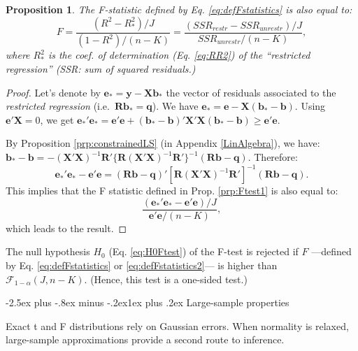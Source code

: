 \documentclass[
  11pt,
]{book}
\makeatletter
\renewcommand\subsection{\@startsection{subsection}{2}{\z@}
  {-2.5ex plus -.8ex minus -.2ex}{1ex plus .2ex}
  {\normalfont\large\bfseries\color{TextbookInk}}}
\newtheorem{proposition}{Proposition}[chapter]
\theoremstyle{definition}
\theoremstyle{definition}
\theoremstyle{definition}
\theoremstyle{definition}
\theoremstyle{remark}
\makeatother
\begin{document}
\begin{proposition}
\protect\hypertarget{prp:Ftest}{}\label{prp:Ftest}The F-statistic defined by Eq. \eqref{eq:defFstatistics} is also equal to:
\begin{equation}
F = \frac{(R^2-R_*^2)/J}{(1-R^2)/(n-K)} =  \frac{(SSR_{restr}-SSR_{unrestr})/J}{SSR_{unrestr}/(n-K)},\label{eq:defFstatistics2}
\end{equation}
where \(R_*^2\) is the coef. of determination (Eq. \eqref{eq:RR2}) of the ``restricted regression'' \emph{(SSR: sum of squared residuals.)}
\end{proposition}

\begin{proof}
Let's denote by \(\mathbf{e}_*=\mathbf{y}-\mathbf{X}\mathbf{b}_*\) the vector of residuals associated to the \emph{restricted regression} (i.e.~\(\mathbf{R}\mathbf{b}_*=\mathbf{q}\)).
We have \(\mathbf{e}_*=\mathbf{e} - \mathbf{X}(\mathbf{b}_*-\mathbf{b})\). Using \(\mathbf{e}'\mathbf{X}=0\), we get \(\mathbf{e}_*'\mathbf{e}_*=\mathbf{e}'\mathbf{e} + (\mathbf{b}_*-\mathbf{b})'\mathbf{X}'\mathbf{X}(\mathbf{b}_*-\mathbf{b}) \ge \mathbf{e}'\mathbf{e}\).

By Proposition \ref{prp:constrainedLS} (in Appendix \ref{LinAlgebra}), we have: \(\mathbf{b}_*-\mathbf{b}=-(\mathbf{X}'\mathbf{X})^{-1} \mathbf{R}'\{\mathbf{R}(\mathbf{X}'\mathbf{X})^{-1}\mathbf{R}'\}^{-1}(\mathbf{R}\mathbf{b} - \mathbf{q})\). Therefore:
\[
\mathbf{e}_*'\mathbf{e}_* - \mathbf{e}'\mathbf{e} = (\mathbf{R}\mathbf{b} - \mathbf{q})'[\mathbf{R}(\mathbf{X}'\mathbf{X})^{-1}\mathbf{R}']^{-1}(\mathbf{R}\mathbf{b} - \mathbf{q}).
\]
This implies that the F statistic defined in Prop. \ref{prp:Ftest1} is also equal to:
\[
\frac{(\mathbf{e}_*'\mathbf{e}_* - \mathbf{e}'\mathbf{e})/J}{\mathbf{e}'\mathbf{e}/(n-K)},
\]
which leads to the result.
\end{proof}

The null hypothesis \(H_0\) (Eq. \eqref{eq:H0Ftest}) of the F-test is rejected if \(F\) ---defined by Eq. \eqref{eq:defFstatistics} or \eqref{eq:defFstatistics2}--- is higher than \(\mathcal{F}_{1-\alpha}(J,n-K)\). (Hence, this test is a one-sided test.)

\subsection{Large-sample properties}\label{largeSample}

Exact t and F distributions rely on Gaussian errors. When normality is relaxed, large-sample approximations provide a second route to inference.
\end{document}
